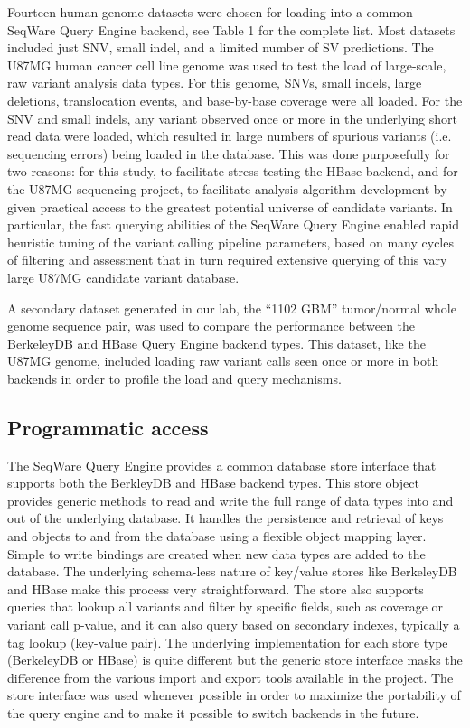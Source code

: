 \documentclass[10pt]{bmc_article}
\newenvironment{bmcformat}{\begin{raggedright}\baselineskip20pt\sloppy\setboolean{publ}{false}}{\end{raggedright}\baselineskip20pt\sloppy}
\begin{document}
\begin{bmcformat}
Fourteen human genome datasets were chosen for loading into a common SeqWare Query Engine backend, see Table 1 for the complete list. Most datasets included just SNV, small indel, and a limited number of SV predictions. The U87MG human cancer cell line genome was used to test the load of large-scale, raw variant analysis data types. For this genome, SNVs, small indels, large deletions, translocation events, and base-by-base coverage were all loaded. For the SNV and small indels, any variant observed once or more in the underlying short read data were loaded, which resulted in large numbers of spurious variants (i.e. sequencing errors) being loaded in the database. This was done purposefully for two reasons: for this study, to facilitate stress testing the HBase backend, and for the U87MG sequencing project, to facilitate analysis algorithm development by given practical access to the greatest potential universe of candidate variants. In particular, the fast querying abilities of the SeqWare Query Engine enabled rapid heuristic tuning of the variant calling pipeline parameters, based on many cycles of filtering and assessment that in turn required extensive querying of this vary large U87MG candidate variant database.

A secondary dataset generated in our lab, the “1102 GBM” tumor/normal whole genome sequence pair, was used to compare the performance between the BerkeleyDB and HBase Query Engine backend types. This dataset, like the U87MG genome, included loading raw variant calls seen once or more in both backends in order to profile the load and query mechanisms.

\subsection*{Programmatic access}

The SeqWare Query Engine provides a common database store interface that supports both the BerkleyDB and HBase backend types. This store object provides generic methods to read and write the full range of data types into and out of the underlying database. It handles the persistence and retrieval of keys and objects to and from the database using a flexible object mapping layer. Simple to write bindings are created when new data types are added to the database. The underlying schema-less nature of key/value stores like BerkeleyDB and HBase make this process very straightforward. The store also supports queries that lookup all variants and filter by specific fields, such as coverage or variant call p-value, and it can also query based on secondary indexes, typically a tag lookup (key-value pair). The underlying implementation for each store type (BerkeleyDB or HBase) is quite different but the generic store interface masks the difference from the various import and export tools available in the project. The store interface was used whenever possible in order to maximize the portability of the query engine and to make it possible to switch backends in the future.


\end{bmcformat}
\end{document}
